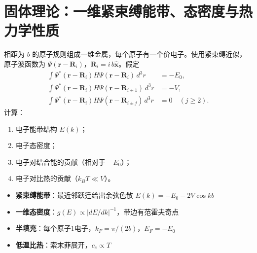\section{固体理论：一维紧束缚能带、态密度与热力学性质}
\label{sec:1d-tight-binding-thermodynamics}

\begin{modelbox}
相距为 $b$ 的原子规则组成一维金属，每个原子有一个价电子。使用紧束缚近似，原子波函数为 $\Psi(\bm{r}-\bm{R}_i)$，$\bm{R}_i=i\,b\hat{\bm{x}}$。假定
\begin{align*}
\int\Psi^*(\bm{r}-\bm{R}_i)H\Psi(\bm{r}-\bm{R}_i)\,d^3r&=-E_0,\\
\int\Psi^*(\bm{r}-\bm{R}_i)H\Psi(\bm{r}-\bm{R}_{i\pm1})\,d^3r&=-V,\\
\int\Psi^*(\bm{r}-\bm{R}_i)H\Psi(\bm{r}-\bm{R}_{i\pm j})\,d^3r&=0\quad(j\ge2).
\end{align*}
计算：
\begin{enumerate}
    \item 电子能带结构 $E(k)$；
    \item 电子态密度；
    \item 电子对结合能的贡献（相对于 $-E_0$）；
    \item 电子对比热的贡献（$k_BT\ll V$）。
\end{enumerate}
\end{modelbox}

\begin{tipbox}[考点快速分析]
\begin{itemize}
    \item \textbf{紧束缚能带}：最近邻跃迁给出余弦色散 $E(k)=-E_0-2V\cos kb$
    \item \textbf{一维态密度}：$g(E)\propto|dE/dk|^{-1}$，带边有范霍夫奇点
    \item \textbf{半填充}：每个原子1电子，$k_F=\pi/(2b)$，$E_F=-E_0$
    \item \textbf{低温比热}：索末菲展开，$c_e\propto T$
\end{itemize}
\end{tipbox}

